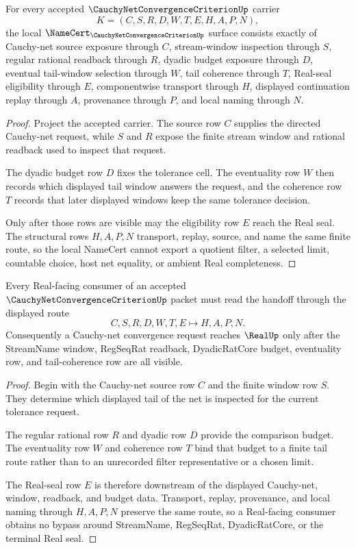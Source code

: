 \begin{theorem}
\label{thm:cauchy-net-convergence-criterion-namecert-obligations}
For every accepted $\CauchyNetConvergenceCriterionUp$ carrier
$$
K=(C,S,R,D,W,T,E,H,A,P,N),
$$
the local $\NameCert_{\CauchyNetConvergenceCriterionUp}$ surface consists exactly of Cauchy-net source exposure through $C$, stream-window inspection through $S$, regular rational readback through $R$, dyadic budget exposure through $D$, eventual tail-window selection through $W$, tail coherence through $T$, Real-seal eligibility through $E$, componentwise transport through $H$, displayed continuation replay through $A$, provenance through $P$, and local naming through $N$.
\end{theorem}
\begin{proof}
Project the accepted carrier. The source row $C$ supplies the directed Cauchy-net request, while $S$ and $R$ expose the finite stream window and rational readback used to inspect that request.

The dyadic budget row $D$ fixes the tolerance cell. The eventuality row $W$ then records which displayed tail window answers the request, and the coherence row $T$ records that later displayed windows keep the same tolerance decision.

Only after those rows are visible may the eligibility row $E$ reach the Real seal. The structural rows $H,A,P,N$ transport, replay, source, and name the same finite route, so the local NameCert cannot export a quotient filter, a selected limit, countable choice, host net equality, or ambient Real completeness.
\end{proof}

\begin{theorem}
\label{thm:cauchy-net-convergence-criterion-real-seal-handoff}
Every Real-facing consumer of an accepted $\CauchyNetConvergenceCriterionUp$ packet must read the handoff through the displayed route
$$
C,S,R,D,W,T,E \longmapsto H,A,P,N .
$$
Consequently a Cauchy-net convergence request reaches $\RealUp$ only after the StreamName window, RegSeqRat readback, DyadicRatCore budget, eventuality row, and tail-coherence row are all visible.
\end{theorem}
\begin{proof}
Begin with the Cauchy-net source row $C$ and the finite window row $S$. They determine which displayed tail of the net is inspected for the current tolerance request.

The regular rational row $R$ and dyadic row $D$ provide the comparison budget. The eventuality row $W$ and coherence row $T$ bind that budget to a finite tail route rather than to an unrecorded filter representative or a chosen limit.

The Real-seal row $E$ is therefore downstream of the displayed Cauchy-net, window, readback, and budget data. Transport, replay, provenance, and local naming through $H,A,P,N$ preserve the same route, so a Real-facing consumer obtains no bypass around StreamName, RegSeqRat, DyadicRatCore, or the terminal Real seal.
\end{proof}

